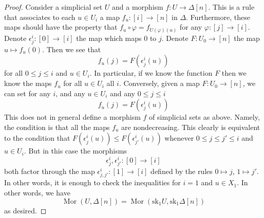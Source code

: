 \documentclass{stacks-project}
\theoremstyle{plain}
\theoremstyle{definition}
\theoremstyle{remark}
\numberwithin{equation}{subsection}
\def\Mor{\mathop{\mathrm{Mor}}\nolimits}
\begin{document}
\begin{proof}
Consider a simplicial set $U$ and a morphism
$f : U \to \Delta[n]$. This is a rule that associates
to each $u \in U_i$ a map $f_u : [i] \to [n]$ in $\Delta$.
Furthermore, these maps should have the property that
$f_u \circ \varphi = f_{U(\varphi)(u)}$ for any
$\varphi : [j] \to [i]$. Denote $\epsilon^i_j : [0] \to [i]$
the map which maps $0$ to $j$. Denote $F : U_0 \to [n]$
the map $u \mapsto f_u(0)$. Then we see that
$$
f_u(j) = F(\epsilon^i_j(u))
$$
for all $0 \leq j \leq i$ and $u \in U_i$.
In particular, if we know the function $F$
then we know the maps $f_u$ for all $u\in U_i$ all $i$.
Conversely, given a map $F : U_0 \to [n]$,
we can set for any $i$, and any $u \in U_i$
and any $0 \leq j \leq i$
$$
f_u(j) = F(\epsilon^i_j(u))
$$
This does not in general define a morphism $f$ of simplicial sets
as above. Namely, the condition is that all the maps $f_u$ are
nondecreasing. This clearly is equivalent to the condition
that $F(\epsilon^i_j(u)) \leq F(\epsilon^i_{j'}(u))$
whenever $0 \leq j \leq j' \leq i$ and $u \in U_i$. But in this
case the morphisms
$$
\epsilon^i_j, \epsilon^i_{j'} : [0] \to [i]
$$
both factor through the map
$\epsilon^i_{j, j'} : [1] \to [i]$ defined by the rules
$0 \mapsto j$, $1 \mapsto j'$.
In other words, it is enough to check the inequalities for
$i = 1$ and $u \in X_1$. In other words, we have
$$
\Mor(U, \Delta[n])
=
\Mor(\text{sk}_1 U, \text{sk}_1 \Delta[n])
$$
as desired.
\end{proof}
\end{document}
